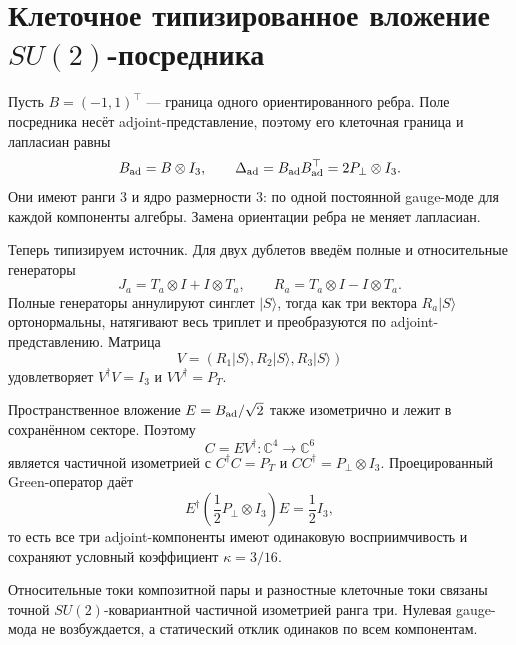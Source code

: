 \chapter{Клеточное типизированное вложение
\texorpdfstring{$SU(2)$}{SU(2)}-посредника}
\label{ch:v10-discrete-resolution-su2-mediator-cell-embedding}

Пусть $B=(-1,1)^\top$ --- граница одного ориентированного ребра. Поле
посредника несёт adjoint-представление, поэтому его клеточная граница и
лапласиан равны
\begin{equation}
 B_{\rm ad}=B\otimes I_3,\qquad
 \Delta_{\rm ad}=B_{\rm ad}B_{\rm ad}^\top
 =2P_\perp\otimes I_3.
\end{equation}
Они имеют ранги $3$ и ядро размерности $3$: по одной постоянной gauge-моде
для каждой компоненты алгебры. Замена ориентации ребра не меняет лапласиан.

Теперь типизируем источник. Для двух дублетов введём полные и относительные
генераторы
\begin{equation}
 J_a=T_a\otimes I+I\otimes T_a,\qquad
 R_a=T_a\otimes I-I\otimes T_a.
\end{equation}
Полные генераторы аннулируют синглет $|S\rangle$, тогда как три вектора
$R_a|S\rangle$ ортонормальны, натягивают весь триплет и преобразуются по
adjoint-представлению. Матрица
\begin{equation}
 V=(R_1|S\rangle,R_2|S\rangle,R_3|S\rangle)
\end{equation}
удовлетворяет $V^\dagger V=I_3$ и $VV^\dagger=P_T$.

Пространственное вложение $E=B_{\rm ad}/\sqrt2$ также изометрично и лежит
в сохранённом секторе. Поэтому
\begin{equation}
 C=EV^\dagger:\mathbb C^4\longrightarrow\mathbb C^6
\end{equation}
является частичной изометрией с $C^\dagger C=P_T$ и
$CC^\dagger=P_\perp\otimes I_3$. Проецированный Green-оператор даёт
\begin{equation}
 E^\dagger\left(\frac12P_\perp\otimes I_3\right)E
 =\frac12I_3,
\end{equation}
то есть все три adjoint-компоненты имеют одинаковую восприимчивость и
сохраняют условный коэффициент $\kappa=3/16$.

\begin{theorem}
Относительные токи композитной пары и разностные клеточные токи связаны
точной $SU(2)$-ковариантной частичной изометрией ранга три. Нулевая gauge-
мода не возбуждается, а статический отклик одинаков по всем компонентам.
\end{theorem}

